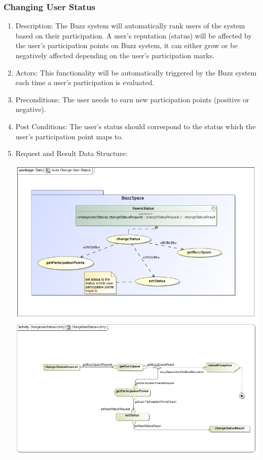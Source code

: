 \documentclass[12pt, oneside]{article}
\begin{document}
\subsubsection{Changing User Status}
\begin{enumerate}
\item Description: The Buzz system will automatically rank users of the system based on their participation. A user's  reputation (status) will be affected by the user's participation points on Buzz system, it can either grow or be negatively affected depending on the user's participation marks.   
\item Actors: This functionality will be automatically triggered by the Buzz system each time a user's participation is evaluated.
\item Preconditions: The user needs to earn new participation points (positive or negative).
\item Post Conditions: The user's status should correspond to the status which the user's participation point maps to.
\item Request and Result Data Structure:
\begin{center}
\includegraphics[scale=0.5]{AutoChangeUserStatus.jpg}
\includegraphics[scale=0.5]{ChangeUserStatusActivity.jpg}
\end{center}
\end{enumerate}
\end{document}

